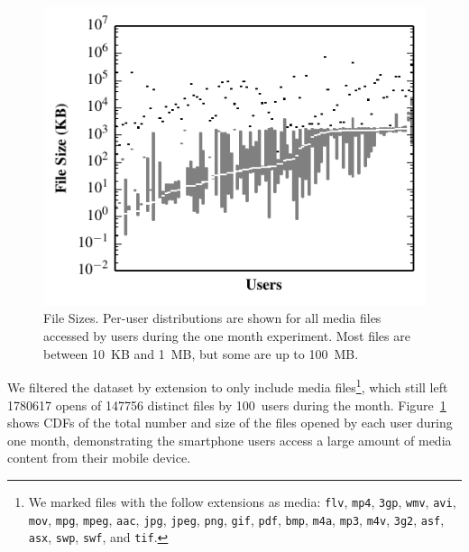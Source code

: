 \begin{figure}[t]

\includegraphics[width=\columnwidth]{./figures/pocketlocker/FileSizeDistributionGraph.pdf}

\caption{\small File Sizes. Per-user distributions are shown for all media
files accessed by \PhoneLab{} users during the one month experiment. Most
files are between 10~KB and 1~MB, but some are up to 100~MB.}

\label{fig-motivation-totals}

\end{figure}

We filtered the dataset by extension to only include media files\footnote{We
marked files with the follow extensions as media: \texttt{flv}, \texttt{mp4},
\texttt{3gp}, \texttt{wmv}, \texttt{avi}, \texttt{mov}, \texttt{mpg},
\texttt{mpeg}, \texttt{aac}, \texttt{jpg}, \texttt{jpeg}, \texttt{png},
\texttt{gif}, \texttt{pdf}, \texttt{bmp}, \texttt{m4a}, \texttt{mp3},
\texttt{m4v}, \texttt{3g2}, \texttt{asf}, \texttt{asx}, \texttt{swp},
\texttt{swf}, and \texttt{tif}.}, which still left \num{1780617} opens of
\num{147756} distinct files by 100~users during the month.
Figure~\ref{fig-motivation-totals} shows CDFs of the total number and size of
the files opened by each \PhoneLab{} user during one month, demonstrating the
smartphone users access a large amount of media content from their mobile
device.

